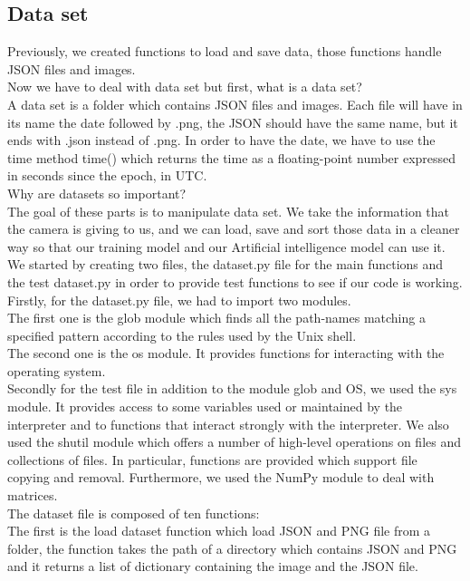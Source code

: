 \documentclass[12pt]{article}
\begin{document}
\newpage 

\subsection{Data set}
Previously, we created functions to load and save data, those functions handle JSON files and images. \\ 
Now we have to deal with data set but first, what is a data set? \\  
A data set is a folder which contains JSON files and images. Each file will have in its name the date followed by .png, the JSON should have the same name, but it ends with .json instead of .png. In order to have the date, we have to use the time method time() which returns the time as a floating-point number expressed in seconds since the epoch, in UTC.\\ 
Why are datasets so important? \\  
The goal of these parts is to manipulate data set. We take the information that the camera is giving to us, and we can load, save and sort those data in a cleaner way so that our training model and our Artificial intelligence model can use it.\\ 
We started by creating two files, the dataset.py file for the main functions and the test dataset.py in order to provide test functions to see if our code is working.\\ 
Firstly, for the dataset.py file, we had to import two modules. \\ 
The first one is the glob module which finds all the path-names matching a specified pattern according to the rules used by the Unix shell.\\
The second one is the os module. It provides functions for interacting with the operating system.\\ 
Secondly for the test file in addition to the module glob and OS, we used the sys module. It provides access to some variables used or maintained by the interpreter and to functions that interact strongly with the interpreter. 
We also used the shutil module which offers a number of high-level operations on files and collections of files. In particular, functions are provided which support file copying and removal. Furthermore, we used the NumPy module to deal with matrices.\\ 
The dataset file is composed of ten functions:\\  
The first is the load dataset function which load JSON and PNG file from a folder, the function takes the path of a directory which contains JSON and PNG and it returns a list of dictionary containing the image and the JSON file.\\ 
\end{document}
